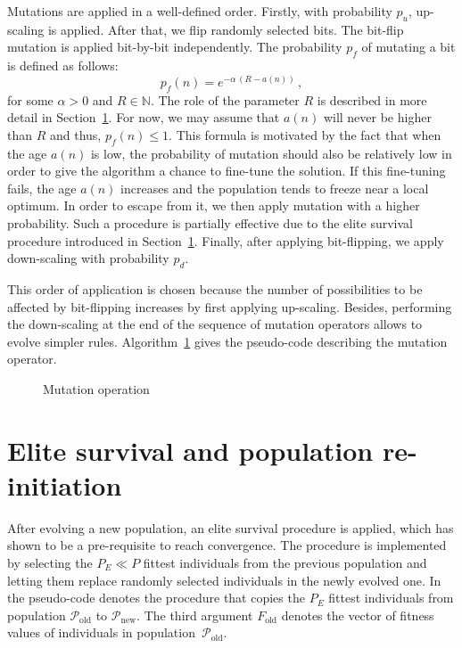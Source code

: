 Mutations are applied in a well-defined order. Firstly, with probability $p_u$, up-scaling is applied. After that, we flip randomly selected bits. The bit-flip mutation is applied bit-by-bit independently. The probability $p_f$ of mutating a bit is defined as follows:
\begin{equation}
	p_f(n) = e^{-\alpha \, (R - a(n))}\,,
\end{equation}
for some $\alpha>0$ and $R\in\mathbb{N}$. The role of the parameter $R$ is described in more detail in Section~\ref{sec:elite}. For now, we may assume that $a(n)$ will never be higher than $R$ and thus, $p_f(n) \leq 1$. This formula is motivated by the fact that when the age $a(n)$ is low, the probability of mutation should also be relatively low in order to give the algorithm a chance to fine-tune the solution. If this fine-tuning fails, the age $a(n)$ increases and the population tends to freeze near a local optimum. In order to escape from it, we then apply mutation with a higher probability. Such a procedure is partially effective due to the elite survival procedure introduced in Section~\ref{sec:elite}. Finally, after applying bit-flipping, we apply down-scaling with probability $p_d$.

This order of application is chosen because the number of possibilities to be affected by bit-flipping increases by first applying up-scaling. Besides, performing the down-scaling at the end of the sequence of mutation operators allows to evolve simpler rules.
Algorithm~\ref{algo:mutate} gives the pseudo-code describing the mutation operator. 

\begin{figure}
\removelatexerror
\begin{algorithm}[H]
\caption{Mutation operation}
\label{algo:mutate}
\end{algorithm}
\end{figure}

\section{Elite survival and population re-initiation}\label{sec:elite}
After evolving a new population, an elite survival procedure is applied, which has shown to be a pre-requisite to reach convergence. The procedure is implemented by selecting the $P_E \ll P$ fittest individuals from the previous population and letting them replace randomly selected individuals in the newly evolved one.
In the pseudo-code  denotes the procedure that copies the $P_E$ fittest individuals from population $\mathcal{P}_{\textrm{old}}$ to $\mathcal{P}_{\textrm{new}}$. The third argument $F_{\textrm{old}}$ denotes the vector of fitness values of individuals in population~$\mathcal{P}_{\textrm{old}}$.

